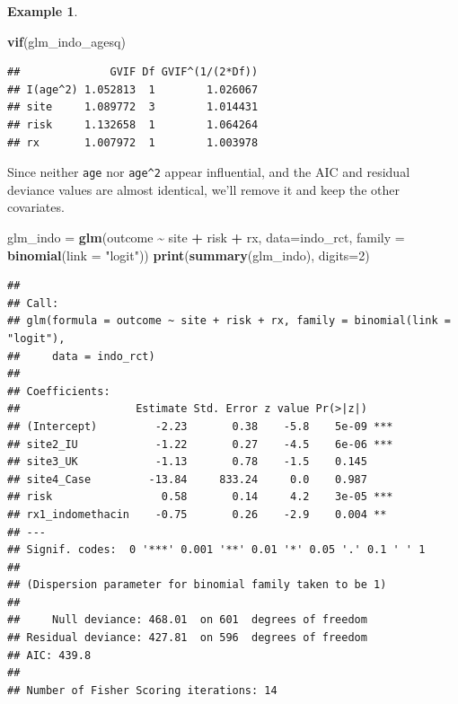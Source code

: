 \documentclass[
  openany]{book}
\newenvironment{Shaded}{\begin{snugshade}}{\end{snugshade}}
\newcommand{\AttributeTok}[1]{\textcolor[rgb]{0.13,0.29,0.53}{#1}}
\newcommand{\DecValTok}[1]{\textcolor[rgb]{0.00,0.00,0.81}{#1}}
\newcommand{\FunctionTok}[1]{\textcolor[rgb]{0.13,0.29,0.53}{\textbf{#1}}}
\newcommand{\NormalTok}[1]{#1}
\newcommand{\OtherTok}[1]{\textcolor[rgb]{0.56,0.35,0.01}{#1}}
\newcommand{\SpecialCharTok}[1]{\textcolor[rgb]{0.81,0.36,0.00}{\textbf{#1}}}
\newcommand{\StringTok}[1]{\textcolor[rgb]{0.31,0.60,0.02}{#1}}
\theoremstyle{definition}
\theoremstyle{definition}
\newtheorem{example}{Example}[chapter]
\theoremstyle{definition}
\theoremstyle{definition}
\theoremstyle{remark}
\begin{document}
\begin{example}
\begin{Shaded}
\begin{Highlighting}[]
\FunctionTok{vif}\NormalTok{(glm\_indo\_agesq)}
\end{Highlighting}
\end{Shaded}

\begin{verbatim}
##              GVIF Df GVIF^(1/(2*Df))
## I(age^2) 1.052813  1        1.026067
## site     1.089772  3        1.014431
## risk     1.132658  1        1.064264
## rx       1.007972  1        1.003978
\end{verbatim}

Since neither \texttt{age} nor \texttt{age\^{}2} appear influential, and the AIC and residual deviance values are almost identical, we'll remove it and keep the other covariates.

\begin{Shaded}
\begin{Highlighting}[]
\NormalTok{glm\_indo }\OtherTok{=} \FunctionTok{glm}\NormalTok{(outcome }\SpecialCharTok{\textasciitilde{}}\NormalTok{ site }\SpecialCharTok{+}\NormalTok{ risk }\SpecialCharTok{+}\NormalTok{ rx, }\AttributeTok{data=}\NormalTok{indo\_rct, }\AttributeTok{family =} \FunctionTok{binomial}\NormalTok{(}\AttributeTok{link =} \StringTok{"logit"}\NormalTok{))}
\FunctionTok{print}\NormalTok{(}\FunctionTok{summary}\NormalTok{(glm\_indo), }\AttributeTok{digits=}\DecValTok{2}\NormalTok{)}
\end{Highlighting}
\end{Shaded}

\begin{verbatim}
## 
## Call:
## glm(formula = outcome ~ site + risk + rx, family = binomial(link = "logit"), 
##     data = indo_rct)
## 
## Coefficients:
##                  Estimate Std. Error z value Pr(>|z|)    
## (Intercept)         -2.23       0.38    -5.8    5e-09 ***
## site2_IU            -1.22       0.27    -4.5    6e-06 ***
## site3_UK            -1.13       0.78    -1.5    0.145    
## site4_Case         -13.84     833.24     0.0    0.987    
## risk                 0.58       0.14     4.2    3e-05 ***
## rx1_indomethacin    -0.75       0.26    -2.9    0.004 ** 
## ---
## Signif. codes:  0 '***' 0.001 '**' 0.01 '*' 0.05 '.' 0.1 ' ' 1
## 
## (Dispersion parameter for binomial family taken to be 1)
## 
##     Null deviance: 468.01  on 601  degrees of freedom
## Residual deviance: 427.81  on 596  degrees of freedom
## AIC: 439.8
## 
## Number of Fisher Scoring iterations: 14
\end{verbatim}


\end{example}
\end{document}
